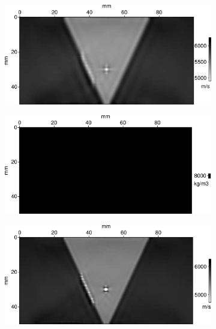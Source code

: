 \begin{figure}[!h]
	\centering
	\begin{subfigure}[b]{0.45\textwidth}
		\includegraphics[width=\textwidth]{img/multi_param/vp_smooth.png}
		\caption{}
	\end{subfigure}
	\begin{subfigure}[b]{0.45\textwidth}
		\includegraphics[width=\textwidth]{img/multi_param/rho_init.png}
		\caption{}
	\end{subfigure}
	\begin{subfigure}[b]{0.45\textwidth}
		\includegraphics[width=\textwidth]{img/multi_param/vp_multi_6000k.png}
		\caption{}
	\end{subfigure}
	\begin{subfigure}[b]{0.45\textwidth}

\end{subfigure}
\end{figure}
